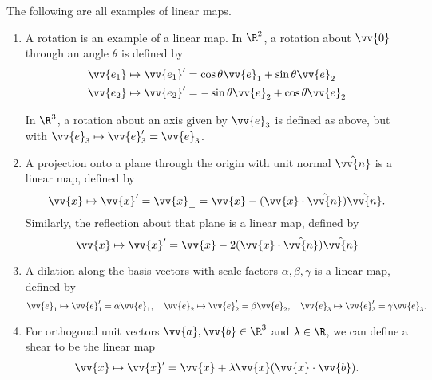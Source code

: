 \begin{example}
The following are all examples of linear maps.
\begin{enumerate}[label=(\roman*)]
    \item A rotation is an example of a linear map. In $\R^2$, a rotation about $\vv{0}$ through an angle $\theta$ is defined by
    \begin{align*}
        \vv{e_1} \mapsto \vv{e_1}' &= \cos \theta \vv{e}_1 + \sin \theta \vv{e}_2 \\
        \vv{e_2} \mapsto \vv{e_2}' &= -\sin \theta \vv{e}_2 + \cos \theta \vv{e}_2
    \end{align*}
    
    \begin{center}
      \end{center}
    
      In $\R^3$, a rotation about an axis given by $\vv{e}_3$ is defined as above, but with $\vv{e}_3 \mapsto \vv{e}_3'= \vv{e}_3$.

      \item A projection onto a plane through the origin with unit normal $\hat{\vv{n}}$ is a linear map, defined by
      $$
      \vv{x} \mapsto \vv{x}'= \vv{x}_{\perp} = \vv{x} - (\vv{x} \cdot \hat{\vv{n}}) \hat{\vv{n}}.
        $$
        Similarly, the reflection about that plane is a linear map, defined by
        $$
        \vv{x} \mapsto \vv{x}' = \vv{x} - 2(\vv{x} \cdot \hat{\vv{n}}) \hat{\vv{n}}
        $$
    \item A dilation along the basis vectors with scale factors $\alpha, \beta, \gamma$ is a linear map, defined by
    $$
    \vv{e}_1 \mapsto \vv{e}_1' = \alpha \vv{e}_1, \quad \vv{e}_2 \mapsto \vv{e}_2' = \beta \vv{e}_2, \quad \vv{e}_3 \mapsto \vv{e}_3' = \gamma \vv{e}_3.
    $$
    \item For orthogonal unit vectors $\vv{a}, \vv{b} \in \R^3$ and $\lambda \in \R$, we can define a shear to be the linear map
    $$
      \vv{x} \mapsto \vv{x}' = \vv{x} + \lambda \vv{x} (\vv{x} \cdot \vv{b}).
    $$
\end{enumerate}
\end{example}

